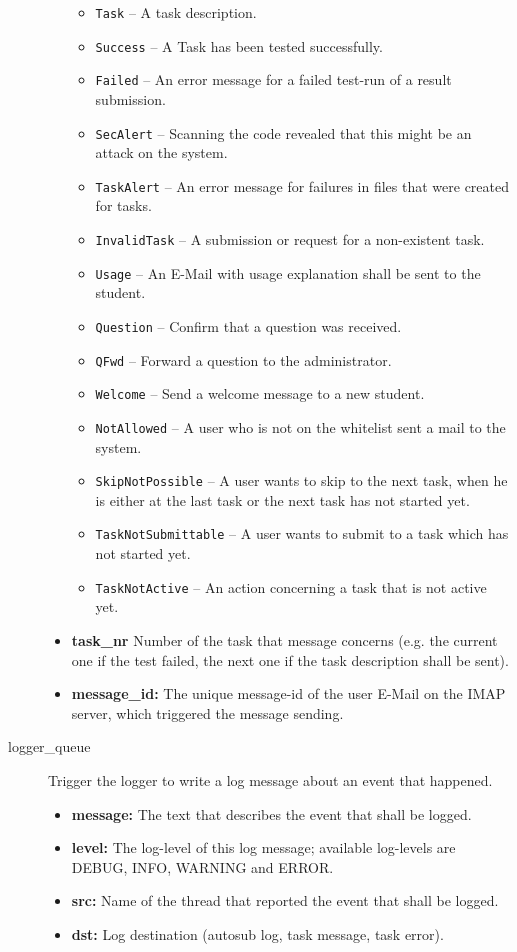 \begin{description}
\begin{itemize}
            \begin{itemize}
				\item {\tt Task} -- A task description.
				\item {\tt Success} -- A Task has been tested successfully.
				\item {\tt Failed} -- An error message for a failed test-run of a result
					submission.
				\item {\tt SecAlert} -- Scanning the code revealed that this might be an
					attack on the system.
				\item {\tt TaskAlert} -- An error message for failures in files that were
					created for tasks.
				\item {\tt InvalidTask} -- A submission or request for a non-existent task.
				\item {\tt Usage} -- An E-Mail with usage explanation shall be sent to the
					student.
				\item {\tt Question} -- Confirm that a question was received.
				\item {\tt QFwd} -- Forward a question to the administrator.
				\item {\tt Welcome} -- Send a welcome message to a new student.
				\item {\tt NotAllowed} -- A user who is not on the whitelist sent a mail
					to the system.
				\item {\tt SkipNotPossible} -- A user wants to skip to the next
					task, when he is either at the last task or the next task has not
					started yet.
				\item {\tt TaskNotSubmittable} -- A user wants to submit to a task
					which has not started yet.
				\item {\tt TaskNotActive} -- An action concerning a task that is not active
					yet.
            \end{itemize}

        \item {\bf task\_nr} Number of the task that message concerns (e.g. the current
			one if the test failed, the next one if the task description shall be sent).
        \item {\bf message\_id:} The unique message-id of the user E-Mail on the IMAP server,
			which triggered the message sending.
    \end{itemize}

\item [logger\_queue] Trigger the logger to write a log message about an event that happened.
    \begin{itemize}
        \item {\bf message:} The text that describes the event that shall be logged.
        \item {\bf level:} The log-level of this log message; available log-levels
			are DEBUG, INFO, WARNING and ERROR.
        \item {\bf src:} Name of the thread that reported the event that shall be logged.
		\item {\bf dst:} Log destination (autosub log, task message, task error).
    \end{itemize}


\end{description}

